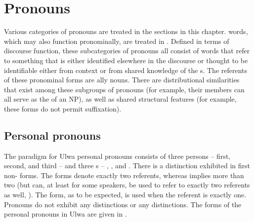 \chapter{Pronouns}\label{sec:6}


Various categories of pronouns are treated in the sections in this chapter.  words, which may also function pronominally, are treated in . Defined in terms of discourse function, these subcategories of pronouns all consist of words that refer to something that is either identified elsewhere in the discourse or thought to be identifiable either from context or from shared knowledge of the s. The referents of these pronominal forms are ally nouns. There are distributional similarities that exist among these subgroups of pronouns (for example, their members can all serve as the  of an NP), as well as shared structural features (for example, these forms do not permit  suffixation).


\section{Personal pronouns}\label{sec:6.1}


The paradigm for Ulwa personal pronouns consists of three persons -- first, second, and third -- and three s -- , , and . There is a  distinction exhibited in first  non- forms. The  forms denote exactly two referents, whereas   implies more than two (but can, at least for some speakers, be used to refer to exactly two referents as well, ). The  form, as to be expected, is used when the referent is exactly one. Pronouns do not exhibit any  distinctions or any  distinctions. The forms of the personal pronouns in Ulwa are given in .


